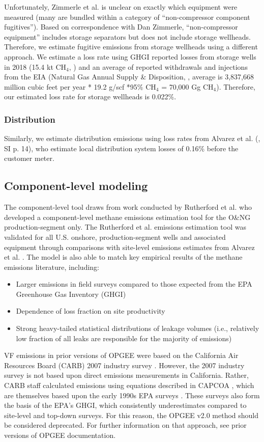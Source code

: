 \documentclass[11pt]{report}
\begin{document}
Unfortunately, Zimmerle et al. \cite{Zimmerle2015} is unclear on exactly which equipment were measured (many are bundled within a category of ``non-compressor component fugitives''). Based on correspondence with Dan Zimmerle, ``non-compressor equipment'' includes storage separators but does not include storage wellheads. Therefore, we estimate fugitive emissions from storage wellheads using a different approach. We estimate a loss rate using GHGI reported losses from storage wells in 2018 (15.4 kt CH$_4$, \cite{EPA2020}) and an average of reported withdrawals and injections from the EIA (Natural Gas Annual Supply \& Disposition, \cite{EIA2019NGAnnual}, average is 3,837,668 million cubic feet per year * 19.2 g/scf *95\% CH$_4$ = 70,000 Gg CH$_4$). Therefore, our estimated loss rate for storage wellheads is 0.022\%.

\subsubsection{Distribution}
Similarly, we estimate distribution emissions using loss rates from Alvarez et al. (\cite[SI p. 14]{Alvarez2018}, SI p. 14), who estimate local distribution system losses of 0.16\% before the customer meter. 

\subsection{Component-level modeling}

The component-level tool draws from work conducted by Rutherford et al. \cite{Rutherford2021} who developed a component-level methane emissions estimation tool for the O\&NG production-segment only. The Rutherford et al. emissions estimation tool was validated for all U.S. onshore, production-segment wells and associated equipment through comparisons with site-level emissions estimates from Alvarez et al. \cite{Alvarez2018}. The model is also able to match key empirical results of the methane emissions literature, including:
\begin{itemize}
\item	Larger emissions in field surveys compared to those expected from the EPA Greenhouse Gas Inventory (GHGI)
\item	Dependence of loss fraction on site productivity
\item	Strong heavy-tailed statistical distributions of leakage volumes (i.e., relatively low fraction of all leaks are responsible for the majority of emissions)
\end{itemize}
VF emissions in prior versions of OPGEE were based on the California Air Resources Board (CARB) 2007 industry survey \cite{ARB2013}. However, the 2007 industry survey is not based upon direct emissions measurements in California. Rather, CARB staff calculated emissions using equations described in CAPCOA \cite{CAPCOA1999}, which are themselves based upon the early 1990s EPA surveys \cite{Hummel1996, API1993a, STAR1995}. These surveys also form the basis of the EPA's GHGI, which consistently underestimates compared to site-level and top-down surveys. For this reason, the OPGEE v2.0 method should be considered deprecated. For further information on that approach, see prior versions of OPGEE documentation.
\end{document}
